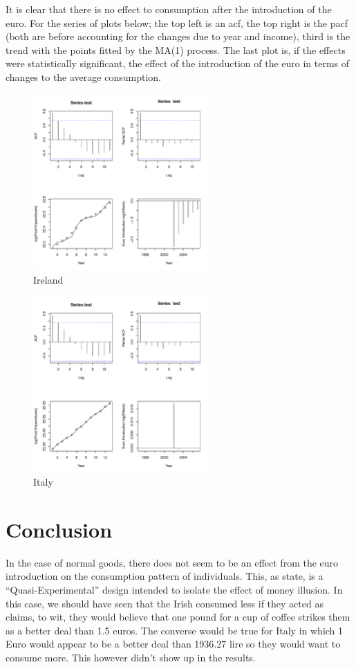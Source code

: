 \documentclass{paper}
\begin{document}
It is clear that there is no effect to consumption after the introduction of the euro. For the series of plots below; the top left is an acf, the top right is the pacf (both are before accounting for the changes due to year and income), third is the trend with the points fitted by the MA(1) process. The last plot is, if the effects were statistically significant, the effect of the introduction of the euro in terms of changes to the average consumption.
\begin{figure}[H]
\centering
\includegraphics[width = 0.6\textwidth]{Ireland.pdf}
\caption{Ireland}
\end{figure}
\begin{figure}[H]
\centering
\includegraphics[width = 0.6\textwidth]{Italy.pdf}
\caption{Italy}
\end{figure}
\section{Conclusion}

In the case of normal goods, there does not seem to be an effect from the euro introduction on the consumption pattern of individuals. This, as \cite{kooretal2004} state, is a ``Quasi-Experimental'' design intended to isolate the effect of money illusion. In this case, we should have seen that the Irish consumed less if they acted as \cite{angner2016} claims, to wit, they would believe that one pound for a cup of coffee strikes them as a better deal than 1.5 euros. The converse would be true for Italy in which 1 Euro would appear to be a better deal than 1936.27 lire so they would want to consume more. This however didn't show up in the results. 
\end{document}
